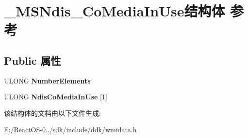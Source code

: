 \hypertarget{struct___m_s_ndis___co_media_in_use}{}\section{\+\_\+\+M\+S\+Ndis\+\_\+\+Co\+Media\+In\+Use结构体 参考}
\label{struct___m_s_ndis___co_media_in_use}
\subsection*{Public 属性}
\begin{DoxyCompactItemize}
\item 
\mbox{\label{struct___m_s_ndis___co_media_in_use_a97bbced72320497af17a3b412ce24787}} 
U\+L\+O\+NG {\bfseries Number\+Elements}
\item 
\mbox{\label{struct___m_s_ndis___co_media_in_use_a5922f8b5d9a014b4d8f764ca51cd05b0}} 
U\+L\+O\+NG {\bfseries Ndis\+Co\+Media\+In\+Use} \mbox{[}1\mbox{]}
\end{DoxyCompactItemize}


该结构体的文档由以下文件生成\+:\begin{DoxyCompactItemize}
\item 
E\+:/\+React\+O\+S-\/0../sdk/include/ddk/wmidata.\+h\end{DoxyCompactItemize}
